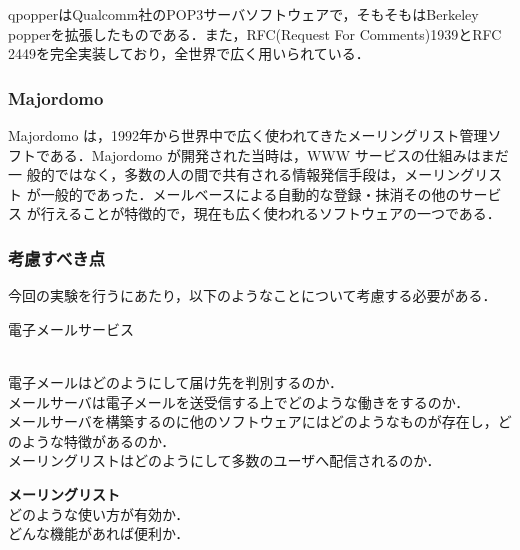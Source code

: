 qpopperはQualcomm社のPOP3サーバソフトウェアで，そもそもはBerkeley
popperを拡張したものである．また，RFC(Request For Comments)1939とRFC
2449を完全実装しており，全世界で広く用いられている．

\subsubsection*{Majordomo}

Majordomo は，1992年から世界中で広く使われてきたメーリングリスト管理ソ
フトである．Majordomo が開発された当時は，WWW サービスの仕組みはまだ一
般的ではなく，多数の人の間で共有される情報発信手段は，メーリングリスト
が一般的であった．メールベースによる自動的な登録・抹消その他のサービス
が行えることが特徴的で，現在も広く使われるソフトウェアの一つである．

\subsubsection*{考慮すべき点}
今回の実験を行うにあたり，以下のようなことについて考慮する必要がある．
\begin{itemize}
{\bf \item{電子メールサービス}}\\
電子メールはどのようにして届け先を判別するのか．\\
メールサーバは電子メールを送受信する上でどのような働きをするのか．\\
メールサーバを構築するのに他のソフトウェアにはどのようなものが存在し，どのような特徴があるのか．\\
メーリングリストはどのようにして多数のユーザへ配信されるのか．
  \item \textbf{メーリングリスト}\\
        どのような使い方が有効か．\\
         どんな機能があれば便利か．
\end{itemize}
